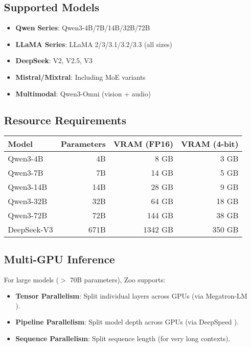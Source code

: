 \documentclass[11pt,a4paper]{article}
\begin{document}
\subsection{Supported Models}

\begin{itemize}
\item \textbf{Qwen Series}: Qwen3-4B/7B/14B/32B/72B \cite{qwen2024qwen3}
\item \textbf{LLaMA Series}: LLaMA 2/3/3.1/3.2/3.3 (all sizes) \cite{touvron2023llama}
\item \textbf{DeepSeek}: V2, V2.5, V3 \cite{bi2024deepseek}
\item \textbf{Mistral/Mixtral}: Including MoE variants \cite{jiang2023mistral}
\item \textbf{Multimodal}: Qwen3-Omni (vision + audio) \cite{chu2024qwen2audio}
\end{itemize}

\subsection{Resource Requirements}

\begin{center}
\begin{tabular}{lrrr}
\toprule
\textbf{Model} & \textbf{Parameters} & \textbf{VRAM (FP16)} & \textbf{VRAM (4-bit)} \\
\midrule
Qwen3-4B & 4B & 8 GB & 3 GB \\
Qwen3-7B & 7B & 14 GB & 5 GB \\
Qwen3-14B & 14B & 28 GB & 9 GB \\
Qwen3-32B & 32B & 64 GB & 18 GB \\
Qwen3-72B & 72B & 144 GB & 38 GB \\
DeepSeek-V3 & 671B & 1342 GB & 350 GB \\
\bottomrule
\end{tabular}
\end{center}

\subsection{Multi-GPU Inference}

For large models ($>$ 70B parameters), Zoo supports:
\begin{itemize}
\item \textbf{Tensor Parallelism}: Split individual layers across GPUs (via Megatron-LM \cite{shoeybi2019megatron}).
\item \textbf{Pipeline Parallelism}: Split model depth across GPUs (via DeepSpeed \cite{rasley2020deepspeed}).
\item \textbf{Sequence Parallelism}: Split sequence length (for very long contexts).
\end{itemize}
\end{document}
